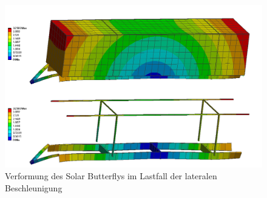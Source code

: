\begin{figure}[H]
  \centering
  \includegraphics[width=1\linewidth]{04_figures/FEM 1.2.png}
  \caption{Verformung des Solar Butterflys im Lastfall der lateralen Beschleunigung}
  \label{FEM 1.2}
\end{figure}

